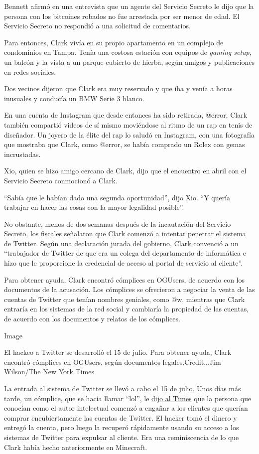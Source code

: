 Bennett afirmó en una entrevista que un agente del Servicio Secreto le
dijo que la persona con los bitcoines robados no fue arrestada por ser
menor de edad. El Servicio Secreto no respondió a una solicitud de
comentarios.

Para entonces, Clark vivía en su propio apartamento en un complejo de
condominios en Tampa. Tenía una costosa estación con equipos de
\emph{gaming setup}, un balcón y la vista a un parque cubierto de
hierba, según amigos y publicaciones en redes sociales.

Dos vecinos dijeron que Clark era muy reservado y que iba y venía a
horas inusuales y conducía un BMW Serie 3 blanco.

En una cuenta de Instagram que desde entonces ha sido retirada, @error,
Clark también compartió videos de sí mismo moviéndose al ritmo de un rap
en tenis de diseñador. Un joyero de la élite del rap lo saludó en
Instagram, con una fotografía que mostraba que Clark, como @error, se
había comprado un Rolex con gemas incrustadas.

Xio, quien se hizo amigo cercano de Clark, dijo que el encuentro en
abril con el Servicio Secreto conmocionó a Clark.

``Sabía que le habían dado una segunda oportunidad'', dijo Xio. ``Y
quería trabajar en hacer las cosas con la mayor legalidad posible''.

No obstante, menos de dos semanas después de la incautación del Servicio
Secreto, los fiscales señalaron que Clark comenzó a intentar penetrar el
sistema de Twitter. Según una declaración jurada del gobierno, Clark
convenció a un ``trabajador de Twitter de que era un colega del
departamento de informática e hizo que le proporcione la credencial de
acceso al portal de servicio al cliente''.

Para obtener ayuda, Clark encontró cómplices en OGUsers, de acuerdo con
los documentos de la acusación. Los cómplices se ofrecieron a negociar
la venta de las cuentas de Twitter que tenían nombres geniales, como @w,
mientras que Clark entraría en los sistemas de la red social y cambiaría
la propiedad de las cuentas, de acuerdo con los documentos y relatos de
los cómplices.

Image

El hackeo a Twitter se desarrolló el 15 de julio. Para obtener ayuda,
Clark encontró cómplices en OGUsers, según documentos
legales.Credit...Jim Wilson/The New York Times

La entrada al sistema de Twitter se llevó a cabo el 15 de julio. Unos
días más tarde, un cómplice, que se hacía llamar ``lol'', le
\href{https://www.nytimes.com/2020/07/17/technology/twitter-hackers-interview.html}{dijo
al Times} que la persona que conocían como el autor intelectual comenzó
a engañar a los clientes que querían comprar encubiertamente las cuentas
de Twitter. El hacker tomó el dinero y entregó la cuenta, pero luego la
recuperó rápidamente usando su acceso a los sistemas de Twitter para
expulsar al cliente. Era una reminiscencia de lo que Clark había hecho
anteriormente en Minecraft.

